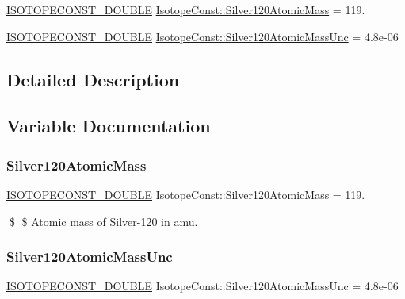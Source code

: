 \begin{DoxyCompactItemize}
\item 
\mbox{\hyperlink{group___isotope_const-_macros_ga8f45a7272ce02c0b4c65c44636ed719a}{I\+S\+O\+T\+O\+P\+E\+C\+O\+N\+S\+T\+\_\+\+D\+O\+U\+B\+LE}} \mbox{\hyperlink{group___isotope_const-_silver-_ag120_ga9c13b2ca6caa58aa28622cf83c52dab5}{Isotope\+Const\+::\+Silver120\+Atomic\+Mass}} = 119.
\item 
\mbox{\hyperlink{group___isotope_const-_macros_ga8f45a7272ce02c0b4c65c44636ed719a}{I\+S\+O\+T\+O\+P\+E\+C\+O\+N\+S\+T\+\_\+\+D\+O\+U\+B\+LE}} \mbox{\hyperlink{group___isotope_const-_silver-_ag120_ga976f041b390dea60829407224b68ca7e}{Isotope\+Const\+::\+Silver120\+Atomic\+Mass\+Unc}} = 4.\+8e-\/06
\end{DoxyCompactItemize}


\subsection{Detailed Description}


\subsection{Variable Documentation}
\mbox{\label{group___isotope_const-_silver-_ag120_ga9c13b2ca6caa58aa28622cf83c52dab5}} 
\subsubsection{\texorpdfstring{Silver120\+Atomic\+Mass}{Silver120AtomicMass}}
{\footnotesize\ttfamily \mbox{\hyperlink{group___isotope_const-_macros_ga8f45a7272ce02c0b4c65c44636ed719a}{I\+S\+O\+T\+O\+P\+E\+C\+O\+N\+S\+T\+\_\+\+D\+O\+U\+B\+LE}} Isotope\+Const\+::\+Silver120\+Atomic\+Mass = 119.}

\$ \$ Atomic mass of Silver-\/120 in amu. \mbox{\label{group___isotope_const-_silver-_ag120_ga976f041b390dea60829407224b68ca7e}} 
\subsubsection{\texorpdfstring{Silver120\+Atomic\+Mass\+Unc}{Silver120AtomicMassUnc}}
{\footnotesize\ttfamily \mbox{\hyperlink{group___isotope_const-_macros_ga8f45a7272ce02c0b4c65c44636ed719a}{I\+S\+O\+T\+O\+P\+E\+C\+O\+N\+S\+T\+\_\+\+D\+O\+U\+B\+LE}} Isotope\+Const\+::\+Silver120\+Atomic\+Mass\+Unc = 4.\+8e-\/06}

